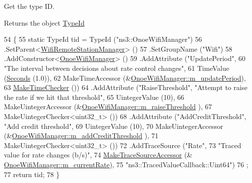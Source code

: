 Get the type ID. 

\begin{DoxyReturn}{Returns}
the object \hyperlink{classns3_1_1TypeId}{Type\+Id} 
\end{DoxyReturn}

\begin{DoxyCode}
54 \{
55   \textcolor{keyword}{static} TypeId tid = TypeId (\textcolor{stringliteral}{"ns3::OnoeWifiManager"})
56     .SetParent<\hyperlink{classns3_1_1WifiRemoteStationManager_a78524840f5900e1937e8e2d6df48954d}{WifiRemoteStationManager}> ()
57     .SetGroupName (\textcolor{stringliteral}{"Wifi"})
58     .AddConstructor<\hyperlink{classns3_1_1OnoeWifiManager_afaae753c06e0ef83c09736804ec6ccdd}{OnoeWifiManager}> ()
59     .AddAttribute (\textcolor{stringliteral}{"UpdatePeriod"},
60                    \textcolor{stringliteral}{"The interval between decisions about rate control changes"},
61                    TimeValue (\hyperlink{group__timecivil_ga33c34b816f8ff6628e33d5c8e9713b9e}{Seconds} (1.0)),
62                    MakeTimeAccessor (&\hyperlink{classns3_1_1OnoeWifiManager_a43506e7013f037ec858df5af2de2f1cb}{OnoeWifiManager::m\_updatePeriod}),
63                    \hyperlink{group__time_ga7032965bd4afa578691d88c09e4481c1}{MakeTimeChecker} ())
64     .AddAttribute (\textcolor{stringliteral}{"RaiseThreshold"}, \textcolor{stringliteral}{"Attempt to raise the rate if we hit that threshold"},
65                    UintegerValue (10),
66                    MakeUintegerAccessor (&\hyperlink{classns3_1_1OnoeWifiManager_abd4f1bac1a93e084879e39100096d8cf}{OnoeWifiManager::m\_raiseThreshold}
      ),
67                    MakeUintegerChecker<uint32\_t> ())
68     .AddAttribute (\textcolor{stringliteral}{"AddCreditThreshold"}, \textcolor{stringliteral}{"Add credit threshold"},
69                    UintegerValue (10),
70                    MakeUintegerAccessor (&\hyperlink{classns3_1_1OnoeWifiManager_ab90c1f44166227ffa41233b0c7c65a52}{OnoeWifiManager::m\_addCreditThreshold}
      ),
71                    MakeUintegerChecker<uint32\_t> ())
72     .AddTraceSource (\textcolor{stringliteral}{"Rate"},
73                      \textcolor{stringliteral}{"Traced value for rate changes (b/s)"},
74                      \hyperlink{group__tracing_gab21a770b9855af4e8f69f7531ea4a6b0}{MakeTraceSourceAccessor} (&
      \hyperlink{classns3_1_1OnoeWifiManager_a5ba916c2f45dd5687c035db25dc86800}{OnoeWifiManager::m\_currentRate}),
75                      \textcolor{stringliteral}{"ns3::TracedValueCallback::Uint64"})
76   ;
77   \textcolor{keywordflow}{return} tid;
78 \}
\end{DoxyCode}


